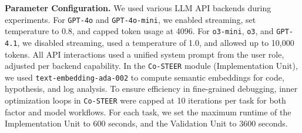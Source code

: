 \documentclass{article}
\begin{document}
\textbf{Parameter Configuration.}
We used various LLM API backends during experiments. For \texttt{GPT-4o} and \texttt{GPT-4o-mini}, we enabled streaming, set temperature to 0.8, and capped token usage at 4096. For \texttt{o3-mini}, \texttt{o3}, and \texttt{GPT-4.1}, we disabled streaming, used a temperature of 1.0, and allowed up to 10,000 tokens. All API interactions used a unified system prompt from the user role, adjusted per backend capability. In the \texttt{Co-STEER} module (Implementation Unit), we used \texttt{text-embedding-ada-002} to compute semantic embeddings for code, hypothesis, and log analysis. To ensure efficiency in fine-grained debugging, inner optimization loops in \texttt{Co-STEER} were capped at 10 iterations per task for both factor and model workflows. For each task, we set the maximum runtime of the Implementation Unit to 600 seconds, and the Validation Unit to 3600 seconds.
\end{document}
